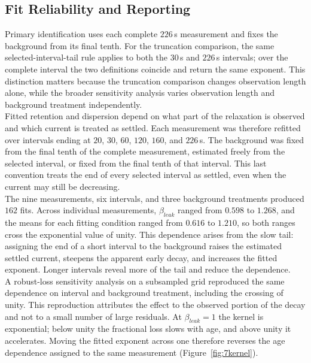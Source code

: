 \subsection[Fit Reliability and Reporting]{Fit Reliability and Reporting}
\label{sec:7p1p2}

\noindent Primary identification uses each complete $226$\,s measurement and fixes the background from its final
tenth. For the truncation comparison, the same selected-interval-tail rule applies to both the $30$\,s and $226$\,s
intervals; over the complete interval the two definitions coincide and return the same exponent. This distinction
matters because the truncation comparison changes observation length alone, while the broader sensitivity analysis
varies observation length and background treatment independently.\\

\noindent Fitted retention and dispersion depend on what part of the relaxation is observed and which current is
treated as settled. Each measurement was therefore refitted over intervals ending at $20$, $30$, $60$, $120$, $160$,
and $226$\,s. The background was fixed from the final tenth of the complete measurement, estimated freely from
the selected interval, or fixed from the final tenth of that interval. This last convention treats the end of every
selected interval as settled, even when the current may still be decreasing.\\

\noindent The nine measurements, six intervals, and three background treatments produced $162$ fits.
Across individual measurements, $\beta_{leak}$ ranged from $0.598$ to $1.268$, and the means for each fitting
condition ranged from $0.616$ to $1.210$, so both ranges cross the exponential value of unity. This dependence arises
from the slow tail: assigning the end of a short interval to the background raises the estimated settled current,
steepens the apparent early decay, and increases the fitted exponent. Longer intervals reveal more of the tail and
reduce the dependence.\\

\noindent A robust-loss sensitivity analysis on a subsampled grid reproduced the same dependence on interval and
background treatment, including the crossing of unity. This reproduction attributes the effect to the observed portion
of the decay and not to a small number of large residuals. At $\beta_{leak}=1$ the kernel is exponential; below unity
the fractional loss slows with age, and above unity it accelerates. Moving the fitted exponent across one therefore
reverses the age dependence assigned to the same measurement (Figure~\ref{fig:7kernel}).\\


